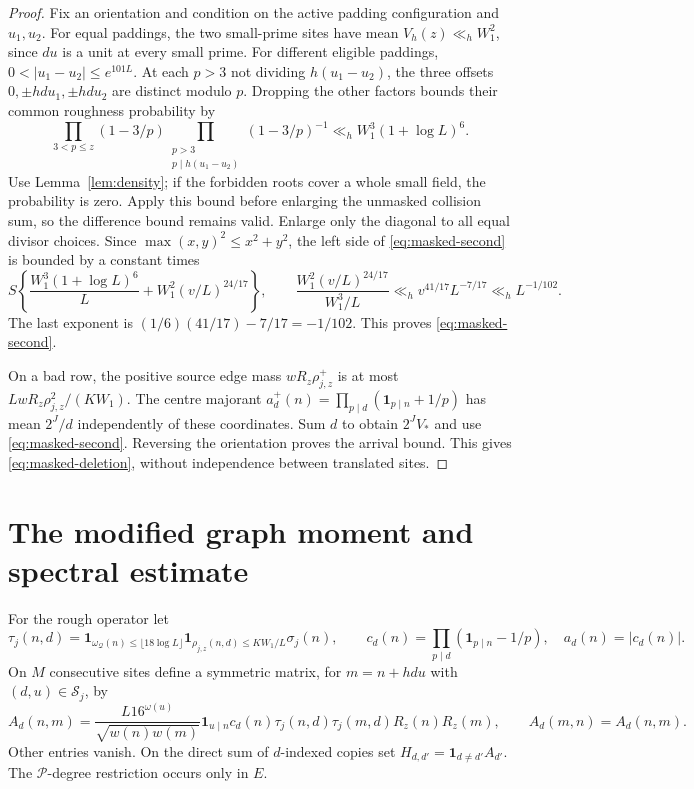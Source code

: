 \documentclass[11pt]{article}
\theoremstyle{definition}
\newcommand{\ind}{\mathbf 1}
\newcommand{\Pset}{\mathcal P}
\theoremstyle{remark}
\numberwithin{equation}{section}
\newcommand{\Qset}{\mathcal Q}
\begin{document}
\begin{proof}
Fix an orientation and condition on the active padding configuration and $u_1,u_2$.
For equal paddings, the two small-prime sites have mean $V_h(z)\ll_h W_1^2$, since $du$ is a unit at every small
prime. For different eligible paddings, $0<|u_1-u_2|\le e^{101L}$.
At each $p>3$ not dividing $h(u_1-u_2)$, the three offsets $0,\pm hdu_1,\pm hdu_2$ are distinct modulo $p$.
Dropping the other factors bounds their common roughness probability by
\begin{equation}\label{eq:triple-rough}
 \prod_{3<p\le z}(1-3/p)
 \prod_{\substack{p>3\\p\mid h(u_1-u_2)}}(1-3/p)^{-1}
 \ll_h W_1^3(1+\log L)^6.
\end{equation}
Use Lemma~\ref{lem:density}; if the forbidden roots cover a whole small field, the probability is zero.
Apply this bound before enlarging the unmasked collision sum, so the difference bound remains valid.
Enlarge only the diagonal to all equal divisor choices. Since $\max(x,y)^2\le x^2+y^2$, the left side of
\eqref{eq:masked-second} is bounded by a constant times
\begin{equation}\label{eq:second-diagonal}
 S\left\{\frac{W_1^3(1+\log L)^6}{L}+W_1^2(v/L)^{24/17}\right\},\qquad
 \frac{W_1^2(v/L)^{24/17}}{W_1^3/L}
 \ll_h v^{41/17}L^{-7/17}\ll_h L^{-1/102}.
\end{equation}
The last exponent is $(1/6)(41/17)-7/17=-1/102$. This proves \eqref{eq:masked-second}.

On a bad row, the positive source edge mass $wR_z\rho_{j,z}^+$ is at most
$LwR_z\rho_{j,z}^2/(KW_1)$. The centre majorant
$a_d^+(n)=\prod_{p\mid d}(\ind_{p\mid n}+1/p)$ has mean $2^J/d$ independently of these coordinates.
Sum $d$ to obtain $2^JV_*$ and use \eqref{eq:masked-second}. Reversing the orientation proves the arrival bound.
This gives \eqref{eq:masked-deletion}, without independence between translated sites.
\end{proof}

\section{The modified graph moment and spectral estimate}\label{sec:moment}
For the rough operator let
\begin{equation}\label{eq:rough-tau}
 \tau_j(n,d)=\ind_{\omega_{\Qset}(n)\le\lfloor18\log L\rfloor}
 \ind_{\rho_{j,z}(n,d)\le KW_1/L}\sigma_j(n),\qquad
 c_d(n)=\prod_{p\mid d}(\ind_{p\mid n}-1/p),\quad a_d(n)=|c_d(n)|.
\end{equation}
On $M$ consecutive sites define a symmetric matrix, for $m=n+hdu$ with $(d,u)\in\mathcal S_j$, by
\begin{equation}\label{eq:rough-matrix}
 A_d(n,m)=\frac{L16^{\omega(u)}}{\sqrt{w(n)w(m)}}\ind_{u\mid n}c_d(n)
 \tau_j(n,d)\tau_j(m,d)R_z(n)R_z(m),\qquad A_d(m,n)=A_d(n,m).
\end{equation}
Other entries vanish. On the direct sum of $d$-indexed copies set
$H_{d,d'}=\ind_{d\ne d'}A_{d'}$. The $\Pset$-degree restriction occurs only in $E$.
\end{document}
